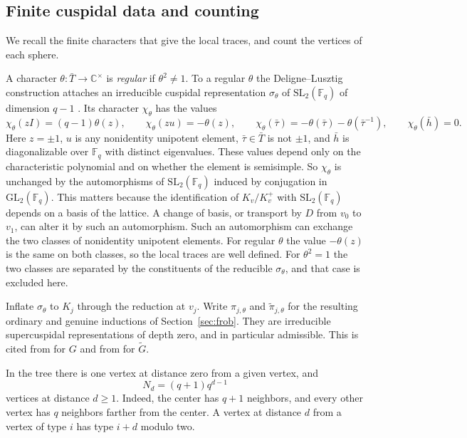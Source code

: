 \documentclass[12pt,letterpaper]{article}
\numberwithin{equation}{section}
\theoremstyle{definition}
\theoremstyle{remark}
\newcommand{\kk}{\mathbb F_q}
\newcommand{\Mp}{\widetilde G}
\begin{document}
\subsection{Finite cuspidal data and counting}
We recall the finite characters that give the local traces, and count the vertices of each sphere.

A character $\theta:\bar T\to\mathbb C^\times$ is \emph{regular} if $\theta^2\ne1$. To a regular $\theta$ the Deligne--Lusztig construction attaches an irreducible cuspidal representation $\sigma_\theta$ of $\mathrm{SL}_2(\kk)$ of dimension $q-1$ \cite{DL76,Bo11}. Its character $\chi_\theta$ has the values
\begin{equation}\label{eq:finite}
 \chi_\theta(zI)=(q-1)\theta(z),\qquad
 \chi_\theta(zu)=-\theta(z),\qquad
 \chi_\theta(\bar\tau)=-\theta(\bar\tau)-\theta(\bar\tau^{-1}),\qquad
 \chi_\theta(\bar h)=0 .
\end{equation}
Here $z=\pm1$, $u$ is any nonidentity unipotent element, $\bar\tau\in\bar T$ is not $\pm1$, and $\bar h$ is diagonalizable over $\kk$ with distinct eigenvalues. These values depend only on the characteristic polynomial and on whether the element is semisimple. So $\chi_\theta$ is unchanged by the automorphisms of $\mathrm{SL}_2(\kk)$ induced by conjugation in $\mathrm{GL}_2(\kk)$. This matters because the identification of $K_v/K_v^+$ with $\mathrm{SL}_2(\kk)$ depends on a basis of the lattice. A change of basis, or transport by $D$ from $v_0$ to $v_1$, can alter it by such an automorphism. Such an automorphism can exchange the two classes of nonidentity unipotent elements. For regular $\theta$ the value $-\theta(z)$ is the same on both classes, so the local traces are well defined. For $\theta^2=1$ the two classes are separated by the constituents of the reducible $\sigma_\theta$, and that case is excluded here.

Inflate $\sigma_\theta$ to $K_j$ through the reduction at $v_j$. Write $\pi_{j,\theta}$ and $\widetilde\pi_{j,\theta}$ for the resulting ordinary and genuine inductions of Section~\ref{sec:frob}. They are irreducible supercuspidal representations of depth zero, and in particular admissible. This is cited from \cite{MP94} for $G$ and from \cite{HW09} for $\Mp$.

In the tree there is one vertex at distance zero from a given vertex, and
\begin{equation}\label{eq:sphere}
 N_d=(q+1)q^{d-1}
\end{equation}
vertices at distance $d\ge1$. Indeed, the center has $q+1$ neighbors, and every other vertex has $q$ neighbors farther from the center. A vertex at distance $d$ from a vertex of type $i$ has type $i+d$ modulo two.
\end{document}
